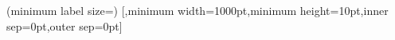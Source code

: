 \documentclass{article}
\begin{document}
\setlength\linewidth{\FitWidth}
\begin{fittedterminaltree}(minimum label size=\MinimumSize)
  [{},minimum width=1000pt,minimum height=10pt,inner sep=0pt,outer sep=0pt]
\end{fittedterminaltree}
\end{document}
